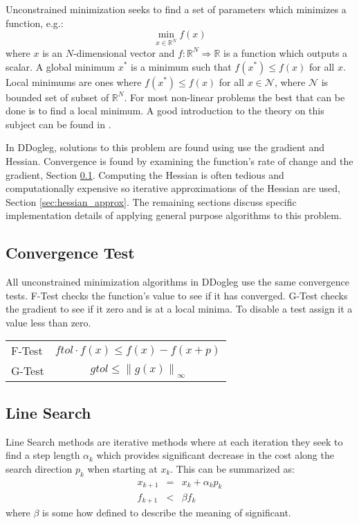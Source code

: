 \documentclass[peerreview,compsoc,onecolumn]{IEEEtran}
\newcommand{\R}{\mathbb{R}}
\newcommand{\norm}[1]{\left\lVert#1\right\rVert}
\begin{document}
Unconstrained minimization seeks to find a set of parameters which minimizes a function, e.g.:
\begin{equation}
\min\limits_{x \in \R^N} f(x)
\end{equation}
where $x$ is an $N$-dimensional vector and $f : \R^N \Rightarrow \R $ is a function which outputs a scalar. A global minimum $x^*$ is a minimum such that $f(x^*) \le f(x)$ for all $x$. Local minimums are ones where $f(x^*) \le f(x)$ for all $x \in \mathcal{N}$, where $\mathcal{N}$ is bounded set of subset of $\R^N$. For most non-linear problems the best that can be done is to find a local minimum. A good introduction to the theory on this subject can be found in \cite{numopt2006}.

In DDogleg, solutions to this problem are found using use the gradient and Hessian. Convergence is found by examining the function's rate of change and the gradient, Section \ref{sec:unmin_convergence}. Computing the Hessian is often tedious and computationally expensive so iterative approximations of the Hessian are used, Section \ref{sec:hessian_approx}. The remaining sections discuss specific implementation details of applying general purpose algorithms to this problem.

\subsection{Convergence Test}
\label{sec:unmin_convergence}

All unconstrained minimization algorithms in DDogleg use the same convergence tests. F-Test checks the function's value to see if it has converged. G-Test checks the gradient to see if it zero and is at a local minima. To disable a test assign it a value less than zero.

\begin{center}
\begin{tabular}{lc}
F-Test & $ftol \cdot f(x)  \leq f(x) - f(x+p)$ \\
G-Test & $gtol \leq \norm{g(x)}_\infty$ 
\end{tabular}
\end{center}
 
\subsection{Line Search}

Line Search methods are iterative methods where at each iteration they seek to find a step length $\alpha_k$ which provides significant decrease in the cost along the search direction $p_k$ when starting at $x_k$. This can be summarized as:
\begin{eqnarray}
x_{k+1} & = & x_k + \alpha_k p_k \\
f_{k+1} & < & \beta f_k
\end{eqnarray}
where $\beta$ is some how defined to describe the meaning of significant.
\end{document}
